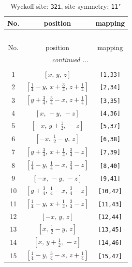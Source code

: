 \documentclass[fleqn,8pt]{jsarticle}
\begin{document}
\renewcommand{\arraystretch}{1.2}
\begin{longtable}{ccc}
\caption{Wyckoff site: {\tt 32i}, site symmetry: {\tt 11'}}
 \\
 \hline \hline
No. & position & mapping \\ \hline \endfirsthead

\multicolumn{2}{l}{\tablename\ \thetable{}} \\
 \hline \hline
No. & position & mapping \\ \hline \endhead

 \hline \hline
\multicolumn{2}{r}{\footnotesize\it continued ...} \\ \endfoot

 \hline \hline
\multicolumn{2}{r}{} \\ \endlastfoot

1 & $\left[ x,\, y,\, z \right]$ & {\tt [1,33]} \\ \hline
2 & $\left[ \frac{1}{4} - y,\, x + \frac{3}{4},\, z + \frac{1}{4} \right]$ & {\tt [2,34]} \\ \hline
3 & $\left[ y + \frac{3}{4},\, \frac{3}{4} - x,\, z + \frac{1}{4} \right]$ & {\tt [3,35]} \\ \hline
4 & $\left[ x,\, - y,\, - z \right]$ & {\tt [4,36]} \\ \hline
5 & $\left[ - x,\, y + \frac{1}{2},\, - z \right]$ & {\tt [5,37]} \\ \hline
6 & $\left[ - x,\, \frac{1}{2} - y,\, z \right]$ & {\tt [6,38]} \\ \hline
7 & $\left[ y + \frac{3}{4},\, x + \frac{1}{4},\, \frac{3}{4} - z \right]$ & {\tt [7,39]} \\ \hline
8 & $\left[ \frac{1}{4} - y,\, \frac{1}{4} - x,\, \frac{3}{4} - z \right]$ & {\tt [8,40]} \\ \hline
9 & $\left[ - x,\, - y,\, - z \right]$ & {\tt [9,41]} \\ \hline
10 & $\left[ y + \frac{3}{4},\, \frac{1}{4} - x,\, \frac{3}{4} - z \right]$ & {\tt [10,42]} \\ \hline
11 & $\left[ \frac{1}{4} - y,\, x + \frac{1}{4},\, \frac{3}{4} - z \right]$ & {\tt [11,43]} \\ \hline
12 & $\left[ - x,\, y,\, z \right]$ & {\tt [12,44]} \\ \hline
13 & $\left[ x,\, \frac{1}{2} - y,\, z \right]$ & {\tt [13,45]} \\ \hline
14 & $\left[ x,\, y + \frac{1}{2},\, - z \right]$ & {\tt [14,46]} \\ \hline
15 & $\left[ \frac{1}{4} - y,\, \frac{3}{4} - x,\, z + \frac{1}{4} \right]$ & {\tt [15,47]} \\ \hline

\end{longtable}
\end{document}
